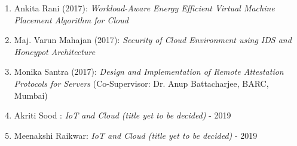 \begin{enumerate} [label=(MT\arabic*).]
\item		Ankita Rani (2017): 	\textit{	Workload-Aware Energy Efficient Virtual Machine Placement Algorithm for Cloud}	
\item		Maj. Varun Mahajan (2017): 	\textit{	Security of Cloud Environment using IDS and Honeypot Architecture}
\item		Monika Santra (2017): 	\textit{	Design and Implementation of Remote Attestation Protocols for Servers} (Co-Supervisor:	Dr. Anup Battacharjee, BARC, Mumbai)
\item		Akriti Sood	: 	\textit{IoT and Cloud (title yet to be decided)}	-	2019
\item		Meenakshi Raikwar: 	\textit{	IoT and Cloud (title yet to be decided)}	-	2019
	\end{enumerate}